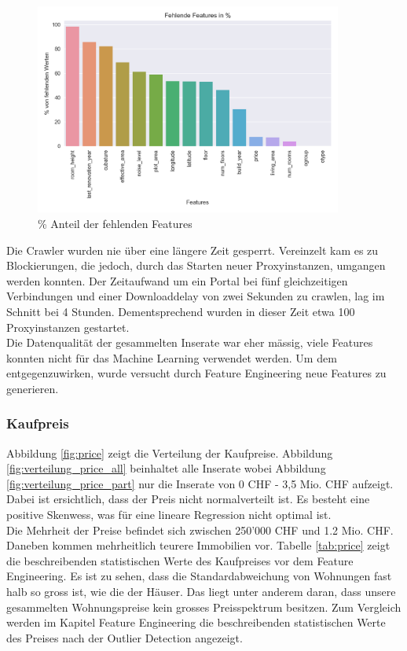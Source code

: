 \begin{figure}[h!]
\centering
\includegraphics[width=0.9\textwidth]{images/missing_values.png}
\caption[\% Anteil der fehlenden Features]{\% Anteil der fehlenden Features}%
\label{fig:features}
\end{figure}

Die Crawler wurden nie über eine längere Zeit gesperrt. Vereinzelt kam es zu Blockierungen, die jedoch, durch das Starten neuer Proxyinstanzen, umgangen werden konnten. Der Zeitaufwand um ein Portal bei fünf gleichzeitigen Verbindungen und einer Downloaddelay von zwei Sekunden zu crawlen, lag im Schnitt bei 4 Stunden. Dementsprechend wurden in dieser Zeit etwa 100 Proxyinstanzen gestartet.\\[2ex]
%
Die Datenqualität der gesammelten Inserate war eher mässig, viele Features konnten nicht für das Machine Learning verwendet werden. Um dem entgegenzuwirken, wurde versucht durch Feature Engineering neue Features zu generieren.

\subsubsection{Kaufpreis}
Abbildung \ref{fig:price} zeigt die Verteilung der Kaufpreise. Abbildung \ref{fig:verteilung_price_all} beinhaltet alle Inserate wobei Abbildung \ref{fig:verteilung_price_part} nur die Inserate von 0 CHF - 3,5 Mio. CHF aufzeigt. Dabei ist ersichtlich, dass der Preis nicht normalverteilt ist. Es besteht eine positive Skenwess, was für eine lineare Regression nicht optimal ist.\\
Die Mehrheit der Preise befindet sich zwischen 250'000 CHF und 1.2 Mio. CHF. Daneben kommen mehrheitlich teurere Immobilien vor. Tabelle \ref{tab:price} zeigt die beschreibenden statistischen Werte des Kaufpreises vor dem Feature Engineering. Es ist zu sehen, dass die Standardabweichung von Wohnungen fast halb so gross ist, wie die der Häuser. Das liegt unter anderem daran, dass unsere gesammelten Wohnungspreise kein grosses Preisspektrum besitzen. Zum Vergleich werden im Kapitel Feature Engineering die beschreibenden statistischen Werte des Preises nach der Outlier Detection angezeigt.

